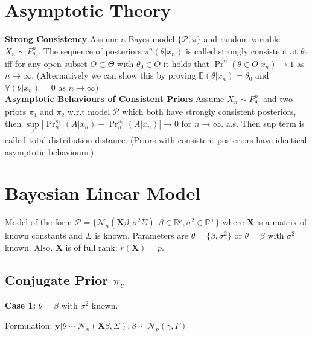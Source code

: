 \documentclass[5pt,a4paper, twocolumn]{article}
\newcommand{\topic}[1]{\section*{#1}}
\newcommand{\subtopic}[1]{\subsection*{#1}}
\newcommand{\keypoint}[1]{\textbf{#1}}
\begin{document}
{\begin{itemize}
\end{itemize}

\topic{Asymptotic Theory}
\keypoint{Strong Consistency} Assume a Bayes model $\{\mathcal{P}, \pi\}$ and random variable $X_n \sim P^n_{\theta_0}$. The sequence of posteriors $\pi^n(\theta \vert x_n)$ is called strongly consistent at $\theta_0$ iff for any open subset $O\subset \Theta$ with $\theta_0 \in O$ it holds that $\Pr^n(\theta \in O \vert x_n) \to 1$ as $n\to \infty$. (Alternatively we can show this by proving $\mathbb{E}(\theta \vert x_n) = \theta_0$ and $\mathbb{V}(\theta \vert x_n)=0$ as $n\to\infty$) \\

\keypoint{Asymptotic Behaviours of Consistent Priors} Assume $X_n \sim P^n_{\theta_0}$ and two priors $\pi_1$ and $\pi_2$ w.r.t model $\mathcal{P}$ which both have strongly consistent posteriors, then $\underset{A}{\sup}\left\vert \Pr_n^{\pi_1}(A \vert x_n) - \Pr_n^{\pi_2}(A \vert x_n)\right\vert \to 0$ for $n\to\infty$. a.s. Then sup term is called total distribution distance. (Priors with consistent posteriors have identical asymptotic behaviours.)

\topic{Bayesian Linear Model}
 Model of the form $\mathcal{P}=\{\mathcal{N}_n(\mathbf{X}\beta, \sigma^2\Sigma)\colon \beta\in\mathbb{R}^p, \sigma^2 \in \mathbb{R}^+ \}$ where $\mathbf{X}$ is a matrix of known constants and $\Sigma$ is known. Parameters are $\theta=\{\beta, \sigma^2\}$ or $\theta=\beta$ with $\sigma^2$ known. Also, $\mathbf{X}$ is of full rank: $r(\mathbf{X})=p$.

\subtopic{Conjugate Prior $\pi_c$}
\textbf{Case 1:} $\theta=\beta$ with $\sigma^2$ known.

Formulation: $\mathbf{y} \vert \theta \sim \mathcal{N}_n (\mathbf{X}\beta, \Sigma), \beta \sim \mathcal{N}_p(\gamma, \Gamma)$

}
\end{document}
